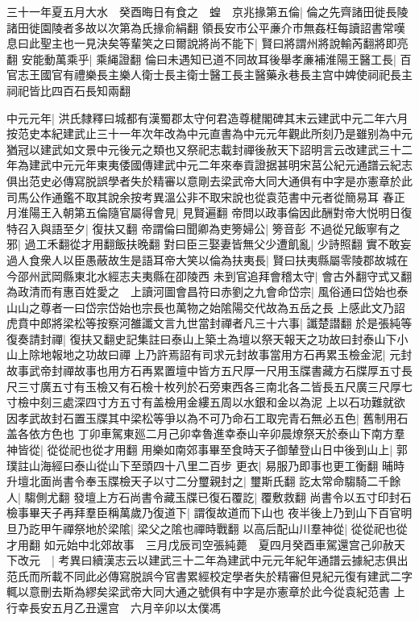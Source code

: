 三十一年夏五月大水　癸酉晦日有食之　蝗　京兆掾第五倫|{
	倫之先齊諸田徙長陵諸田徙園陵者多故以次第為氏掾俞絹翻}
領長安市公平亷介市無姦枉每讀詔書常嘆息曰此聖主也一見決矣等輩笑之曰爾說將尚不能下|{
	賢曰將謂州將說輸芮翻將即亮翻}
安能動萬乘乎|{
	乘䋲證翻}
倫曰未遇知已道不同故耳後舉孝亷補淮陽王醫工長|{
	百官志王國官有禮樂長主樂人衛士長主衛士醫工長主醫藥永巷長主宫中婢使祠祀長主祠祀皆比四百石長知兩翻}


中元元年|{
	洪氏隸釋曰城都有漢蜀郡太守何君造尊楗閣碑其末云建武中元二年六月按范史本紀建武止三十一年次年改為中元直書為中元元年觀此所刻乃是雖别為中元猶冠以建武如文景中元後元之類也又祭祀志載封禪後赦天下詔明言云改建武三十二年為建武中元元年東夷倭國傳建武中元二年來奉貢證据甚明宋莒公紀元通譜云紀志俱出范史必傳寫脱誤學者失於精審以意剛去梁武帝大同大通俱有中字是亦憲章於此司馬公作通鑑不取其說余按考異溫公非不取宋說也從袁范書中元者從簡易耳}
春正月淮陽王入朝第五倫隨官屬得會見|{
	見賢遍翻}
帝問以政事倫因此酬對帝大悦明日復特召入與語至夕|{
	復扶又翻}
帝謂倫曰聞卿為吏篣婦公|{
	篣音彭}
不過從兄飯寧有之邪|{
	過工禾翻從才用翻飯扶晚翻}
對曰臣三娶妻皆無父少遭飢亂|{
	少詩照翻}
實不敢妄過人食衆人以臣愚蔽故生是語耳帝大笑以倫為扶夷長|{
	賢曰扶夷縣屬零陵郡故城在今邵州武岡縣東北水經志夫夷縣在卲陵西}
未到官追拜會稽太守|{
	會古外翻守式又翻}
為政清而有惠百姓愛之　上讀河圖會昌符曰赤劉之九會命岱宗|{
	風俗通曰岱始也泰山山之尊者一曰岱宗岱始也宗長也萬物之始隂陽交代故為五岳之長}
上感此文乃詔虎賁中郎將梁松等按察河雒讖文言九世當封禪者凡三十六事|{
	讖楚譛翻}
於是張純等復奏請封禪|{
	復扶又翻史記集註曰泰山上築土為壇以祭天報天之功故曰封泰山下小山上除地報地之功故曰禪}
上乃許焉詔有司求元封故事當用方石再累玉檢金泥|{
	元封故事武帝封禪故事也用方石再累置壇中皆方五尺厚一尺用玉牒書藏方石牒厚五寸長尺三寸廣五寸有玉檢又有石檢十枚列於石旁東西各三南北各二皆長五尺廣三尺厚七寸檢中刻三處深四寸方五寸有盖檢用金縷五周以水銀和金以為泥}
上以石功難就欲因孝武故封石置玉牒其中梁松等爭以為不可乃命石工取完青石無必五色|{
	舊制用石盖各依方色也}
丁卯車駕東廵二月己卯幸魯進幸泰山辛卯晨燎祭天於泰山下南方羣神皆從|{
	從從祀也從才用翻}
用樂如南郊事畢至食時天子御輦登山日中後到山上|{
	郭璞註山海經曰泰山從山下至頭四十八里二百步}
更衣|{
	易服乃即事也更工衡翻}
晡時升壇北面尚書令奉玉牒檢天子以寸二分璽親封之|{
	璽斯氏翻}
訖太常命騶騎二千餘人|{
	騶側尤翻}
發壇上方石尚書令藏玉牒已復石覆訖|{
	覆敷救翻}
尚書令以五寸印封石檢事畢天子再拜羣臣稱萬歲乃復道下|{
	謂復故道而下山也}
夜半後上乃到山下百官明旦乃訖甲午禪祭地於梁隂|{
	梁父之隂也禪時戰翻}
以高后配山川羣神從|{
	從從祀也從才用翻}
如元始中北郊故事　三月戊辰司空張純薨　夏四月癸酉車駕還宫己卯赦天下改元　|{
	考異曰續漢志云以建武三十二年為建武中元元年紀年通譜云據紀志俱出范氏而所載不同此必傳寫脱誤今官書累經校定學者失於精審但見紀元復有建武二字輒以意刪去斯為繆矣梁武帝大同大通之號俱有中字是亦憲章於此今從袁紀范書}
上行幸長安五月乙丑還宫　六月辛卯以太僕馮

